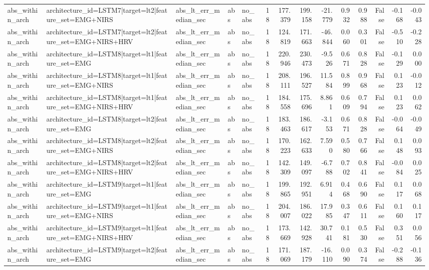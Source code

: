 \begin{table}
\begin{tabular}{lllllrrrrrrrrr}
abs_within_arch & architecture_id=LSTM7|target=lt2|feature_set=EMG+NIRS & abs_lt_err_median_sec & abs & no_abs & 18 & 177.379 & 199.158 & -21.779 & 0.932 & 0.988 & False & -0.168 & -0.043 \\
abs_within_arch & architecture_id=LSTM7|target=lt2|feature_set=EMG+NIRS+HRV & abs_lt_err_median_sec & abs & no_abs & 18 & 124.819 & 171.663 & -46.844 & 0.060 & 0.301 & False & -0.510 & -0.228 \\
abs_within_arch & architecture_id=LSTM8|target=lt1|feature_set=EMG & abs_lt_err_median_sec & abs & no_abs & 18 & 220.946 & 230.473 & -9.526 & 0.671 & 0.828 & False & -0.129 & 0.000 \\
abs_within_arch & architecture_id=LSTM8|target=lt1|feature_set=EMG+NIRS & abs_lt_err_median_sec & abs & no_abs & 18 & 208.111 & 196.527 & 11.584 & 0.899 & 0.968 & False & 0.123 & -0.012 \\
abs_within_arch & architecture_id=LSTM8|target=lt1|feature_set=EMG+NIRS+HRV & abs_lt_err_median_sec & abs & no_abs & 18 & 184.558 & 175.696 & 8.861 & 0.609 & 0.794 & False & 0.123 & 0.062 \\
abs_within_arch & architecture_id=LSTM8|target=lt2|feature_set=EMG & abs_lt_err_median_sec & abs & no_abs & 18 & 183.463 & 186.617 & -3.153 & 0.671 & 0.828 & False & -0.064 & -0.049 \\
abs_within_arch & architecture_id=LSTM8|target=lt2|feature_set=EMG+NIRS & abs_lt_err_median_sec & abs & no_abs & 18 & 170.223 & 162.633 & 7.590 & 0.580 & 0.766 & False & 0.148 & 0.093 \\
abs_within_arch & architecture_id=LSTM8|target=lt2|feature_set=EMG+NIRS+HRV & abs_lt_err_median_sec & abs & no_abs & 18 & 142.309 & 149.097 & -6.788 & 0.702 & 0.841 & False & -0.084 & 0.025 \\
abs_within_arch & architecture_id=LSTM9|target=lt1|feature_set=EMG & abs_lt_err_median_sec & abs & no_abs & 18 & 199.865 & 192.951 & 6.914 & 0.468 & 0.690 & False & 0.117 & 0.068 \\
abs_within_arch & architecture_id=LSTM9|target=lt1|feature_set=EMG+NIRS & abs_lt_err_median_sec & abs & no_abs & 18 & 204.007 & 186.022 & 17.985 & 0.347 & 0.611 & False & 0.160 & 0.117 \\
abs_within_arch & architecture_id=LSTM9|target=lt1|feature_set=EMG+NIRS+HRV & abs_lt_err_median_sec & abs & no_abs & 18 & 173.669 & 142.928 & 30.741 & 0.181 & 0.530 & False & 0.351 & 0.056 \\
abs_within_arch & architecture_id=LSTM9|target=lt2|feature_set=EMG & abs_lt_err_median_sec & abs & no_abs & 18 & 171.069 & 187.179 & -16.110 & 0.090 & 0.374 & False & -0.288 & -0.136 \\

\end{tabular}
\end{table}
